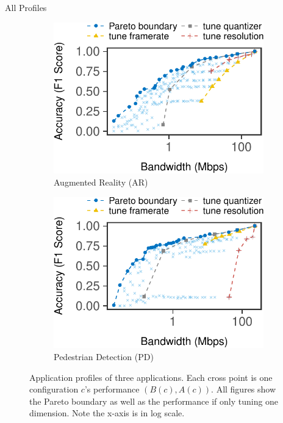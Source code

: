 \begin{frame}{All Profiles}
  \begin{figure}[htb]
    \centering
    \begin{subfigure}[t]{0.49\textwidth}
      \centering
      \includegraphics[width=\textwidth]{figures/profile-darknet.pdf}
      \caption{Augmented Reality (AR)}
      \label{fig:ar-profile}
    \end{subfigure}
    \hfill
    \begin{subfigure}[t]{0.49\textwidth}
      \centering
      \includegraphics[width=\textwidth]{figures/profile-mot.pdf}
      \caption{Pedestrian Detection (PD)}
      \label{fig:pd-profile}
    \end{subfigure}
    \caption{Application profiles of three applications. Each cross point is one
      configuration $c$'s performance $(B(c), A(c))$. All figures show the
      Pareto boundary as well as the performance if only tuning one
      dimension. Note the x-axis is in log scale.}
    \label{fig:all-profiles}
  \end{figure}
\end{frame}

